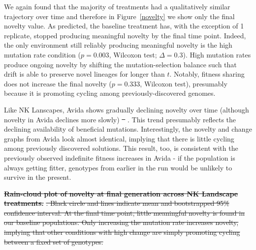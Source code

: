 \documentclass[letterpaper]{article}
\providecommand{\DIFaddtex}[1]{{\protect\color{blue}\uwave{#1}}} %
\providecommand{\DIFdeltex}[1]{{\protect\color{red}\sout{#1}}}                      %
\providecommand{\DIFaddbegin}{} %
\providecommand{\DIFaddend}{} %
\providecommand{\DIFdelbegin}{} %
\providecommand{\DIFdelend}{} %
\providecommand{\DIFdelFL}[1]{\DIFdel{#1}} %
\providecommand{\DIFadd}[1]{\texorpdfstring{\DIFaddtex{#1}}{#1}} %
\providecommand{\DIFdel}[1]{\texorpdfstring{\DIFdeltex{#1}}{}} %
\begin{document}
We again found that the majority of treatments had a qualitatively similar trajectory over time and therefore in Figure~\ref{novelty} we show only the final novelty value. As predicted, the baseline treatment has, with the exception of 1 replicate, stopped producing meaningful novelty by the final time point. Indeed, the only environment still reliably producing meaningful novelty is the high mutation rate condition ($p=0.003$, Wilcoxon test; \DIFaddbegin \DIFadd{Glass's }\DIFaddend $\Delta=0.3$). High mutation rates produce ongoing novelty by shifting the mutation-selection balance such that drift is able to preserve novel lineages for longer than $t$. Notably, fitness sharing does not increase the final novelty ($p=0.333$, Wilcoxon test), presumably because it is promoting cycling among previously-discovered genomes.

Like NK Lanscapes, Avida shows gradually declining novelty over time (although novelty in Avida declines more slowly) \DIFdelbegin \DIFdel{\mbox{%
\citep{emily_dolson_2018_1442906}}\hspace{0pt}%
}\DIFdelend \DIFaddbegin \DIFadd{\mbox{%
\citep{zenodo_dolson_data_2018}}\hspace{0pt}%
}\DIFaddend . This trend presumably reflects the declining availability of beneficial mutations. Interestingly, the novelty and change graphs from Avida look almost identical, implying that there is little cycling among previously discovered solutions. This result, too, is consistent with the previously observed indefinite fitness increases in Avida \citep{wiser_analysis_2015} - if the population is always getting fitter, genotypes from earlier in the run would be unlikely to survive in the present.

\DIFdelbegin %
{%
\textbf{\DIFdelFL{Rain-cloud plot of novelty at final generation across NK Landscape treatments.}} %
\DIFdelFL{. Black circle and lines indicate mean and bootstrapped 95\% confidence interval. At the final time point, little meaningful novelty is found in our baseline populations. Only increasing the mutation rate increases novelty, implying that other conditions with high change are simply promoting cycling between a fixed set of genotypes.}}
\end{document}
